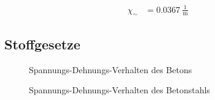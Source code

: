 \documentclass[
  11pt,
  letterpaper,
]{scrreprt}
\begin{document}
$$
\begin{aligned}
\chi_{\sim} &= 0.0367\ \frac{1}{\mathrm{m}} \;
\end{aligned}
$$

\subsection{Stoffgesetze}\label{stoffgesetze}

\begin{figure}[H]


\caption{\label{fig-sigma_epc_t6}Spannungs-Dehnungs-Verhalten des
Betons}

\end{figure}%

\begin{figure}[H]


\caption{\label{fig-sigma_eps_t6}Spannungs-Dehnungs-Verhalten des
Betonstahls}

\end{figure}%
\end{document}
